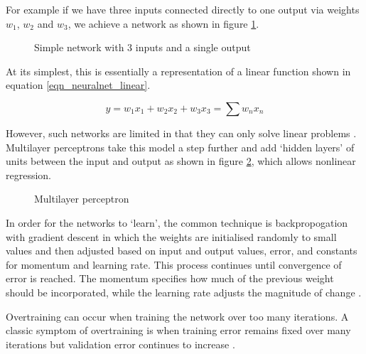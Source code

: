 For example if we have three inputs connected directly to one output via
weights $w_1$, $w_2$ and $w_3$, we achieve a network as shown in figure \ref{fig_neuralnet1}.

\begin{figure}[h!]
\caption{Simple network with 3 inputs and a single output}
\label{fig_neuralnet1}
\end{figure}


At its simplest, this is essentially a representation of a linear function shown
in equation \ref{eqn_neuralnet_linear}.

\begin{equation}
\label{eqn_neuralnet_linear}
y = w_1x_1 + w_2x_2 + w_3x_3 =  \sum w_nx_n
\end{equation}

However, such networks are limited in that they can only solve linear
problems \cite{intro_to_machine_learning_2010}. Multilayer
perceptrons take this model a step further and add `hidden layers' of units between the
input and output as shown in figure \ref{fig_neuralnet2}, which allows nonlinear regression.

\begin{figure}[h!]
\caption{Multilayer perceptron}
\label{fig_neuralnet2}
\end{figure}

In order for the networks to `learn', the common technique is backpropogation with gradient
descent in which
the weights are initialised randomly to small values and then adjusted based on input and
output values, error, and constants for momentum and learning rate. This process
continues until convergence of error is reached. The momentum
specifies how much of the previous weight should be incorporated, while the learning
rate adjusts the magnitude of change \cite{intro_to_machine_learning_2010}.

Overtraining can occur when training the network over too many iterations. A classic symptom
of overtraining is when training error remains fixed over many iterations but validation error
continues to increase \cite{intro_to_machine_learning_2010}.

